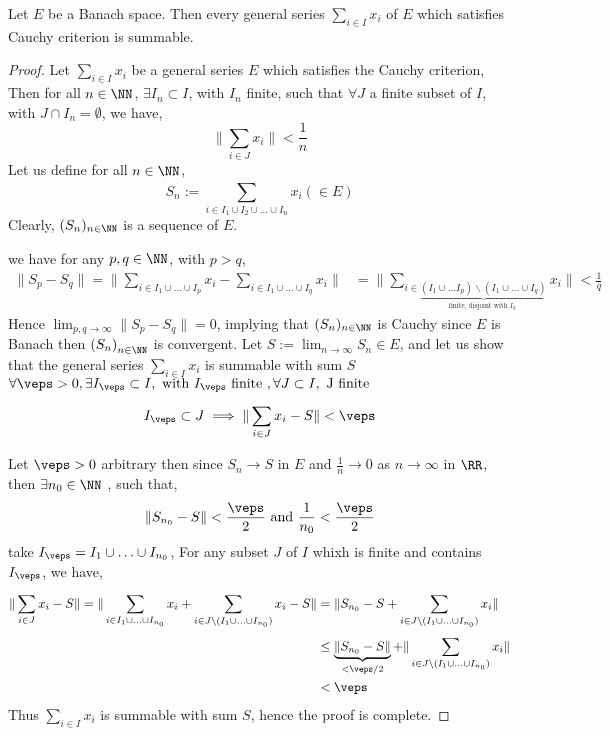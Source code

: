 % 
% 

\lecday[2025-04-10]

% 
\begin{theorem}[]
	Let $E $ be a Banach space. Then every general series
	$\sum_{i \in  I}^{} x_{i} $ of $E $ which satisfies Cauchy 
	criterion is summable.
\end{theorem}
\begin{proof}
Let $\sum_{i \in  I}^{} x_{i} $ be a general series $E $ which satisfies
the Cauchy criterion, Then for all $n \in \NN $, $\exists  I_{n} \subset I $,
with $I_{n} $  finite, such that $\forall J $ a finite subset of
$I $, with $J \cap I_{n} = \emptyset  $, we have, 
\[
\| \sum_{i \in J}^{} x_{i} \|  < \frac{1}{n} 
\]
Let us define for all $n \in \NN $, 
\[
S_{n} := \sum_{i \in  I_1 \cup I_2 \cup \hdots \cup I_{n}}^{}  x_{i} 
\left( \in  E \right)
\]
Clearly, $(S_{n}) _{n \in \NN} $  is a sequence of $E$.

we have for any $p,q \in \NN $, with $p > q $, 
\begin{align*}
\| S_{p} - S_{q} \|  = 
\| \sum_{i \in I_1 \cup \hdots \cup  I_{p}}^{} x_{i} - 
\sum_{i \in I_1 \cup  \hdots  \cup  I_{q}}^{} x_{i} \|  &=
\| \sum_{i \in 
\underbrace{
( I_1 \cup \hdots  I_{p}) \backslash  (I_1 \cup  \hdots  \cup I_{q}) 
}_{ \text{ finite, disjoint with $I_{q} $ } } 
}^{}  
x_{i}\|  <  \frac{1}{q}
\end{align*}
Hence $\lim_{p,q \to \infty} \| S_{p} - S_{q} \| = 0 $, implying
that $(S_{n}) _{n \in \NN} $ is Cauchy since $E $ is Banach then 
$\left( S_{n} \right)_{n \in \NN} $ is convergent. Let
$S := \lim_{n \to \infty }  S_{n} \in E$, and let us show that the general
series $\sum_{i \in I}^{} x_{i} $  is summable with sum $S$ 
$\forall  \veps  > 0, \exists I_{\veps  }\subset I, \text{ with } 
I_{\veps } \text{ finite }, \forall  J \subset I, \text{ J finite }$
\[
I_{\veps }\subset  J \implies 
\| \sum_{i \in J}^{} x_{i} - S \|  <  \veps 
\]

Let $\veps  > 0 $ arbitrary then since $S_{n} \rightarrow S $ 
in $E $ and 
$\frac{1}{n} \rightarrow 0 $  as $n \rightarrow \infty  $  in $\RR  $, 
then $\exists  n_0  \in \NN$ , such that, 
\[
\| S_{n_0} - S \|  < \frac{\veps }{2} \text{ and } 
\frac{1}{n_0} <  \frac{\veps }{2}
\]
take $I_{\veps } = I_1 \cup  \hdots  \cup  I_{n_0}$, 
For any subset $J $ of $I$ whixh is finite 
and contains $I_{\veps } $, we have, 
\begin{align*}
\| \sum_{i \in J}^{} x_{i} - S  \|  = 
\| \sum_{i \in  I_1 \cup \hdots \cup  I_{n_0}}^{}  x_{i} + 
\sum_{i \in  J \backslash 
(I_1 \cup  \hdots \cup  I_{n_0}) }^{} x_{i} - S\|   
&= \| S_{n_0} - S + \sum_{i \in J \backslash 
(I_1 \cup  \hdots  \cup  I_{n_0}) }^{} x_{i}  \|  \\
& \leq 
\underbrace{
\| S_{n_0} - S \|   
}_{ < \veps/2} 
+
\| \sum_{i \in  J \backslash ( I_1 \cup  \hdots  \cup  
I_{n_0}) }^{} x_{i}  \|   \\
& <  \veps 
\end{align*}
Thus $\sum_{i \in I}^{} x_{i} $  is 
summable with sum $S $, hence the proof is complete.
\end{proof}
